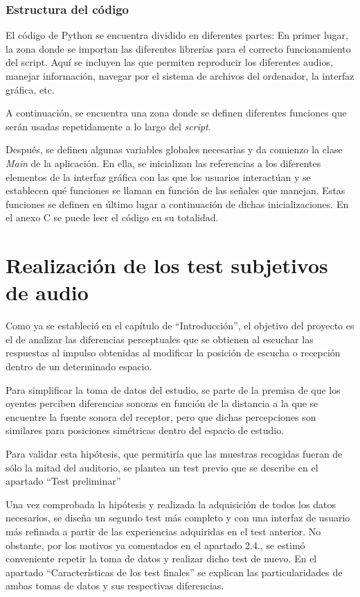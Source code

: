 \documentclass[11pt,a4paper]{book}
\begin{document}
            \subsection{Estructura del código}
                El código de Python se encuentra dividido en diferentes partes:
                En primer lugar, la zona donde se importan las diferentes librerías para el correcto funcionamiento del script. Aquí se incluyen las que permiten reproducir los diferentes audios, manejar información, navegar por el sistema de archivos del ordenador, la interfaz gráfica, etc.
                
                A continuación, se encuentra una zona donde se definen diferentes funciones que serán usadas repetidamente a lo largo del \textit{script}. 
                
                Después, se definen algunas variables globales necesarias y da comienzo la clase \textit{Main} de la aplicación. En ella, se inicializan las referencias a los diferentes elementos de la interfaz gráfica con las que los usuarios interactúan y se establecen qué funciones se llaman en función de las señales que manejan. Estas funciones se definen en último lugar a continuación de dichas inicializaciones. En el anexo C se puede leer el código en su totalidad.
                
\chapter{Realización de los test subjetivos de audio}
        Como ya se estableció en el capítulo de ``Introducción'', el objetivo del proyecto es el de analizar las diferencias perceptuales que se obtienen al escuchar las respuestas al impulso obtenidas al modificar la posición de escucha o recepción dentro de un determinado espacio.
        
        Para simplificar la toma de datos del estudio, se parte de la premisa de que los oyentes perciben diferencias sonoras en función de la distancia a la que se encuentre la fuente sonora del receptor, pero que dichas percepciones son similares para posiciones simétricas dentro del espacio de estudio.
        
        Para validar esta hipótesis, que permitiría que las muestras recogidas fueran de sólo la mitad del auditorio, se plantea un test previo que se describe en el apartado ``Test preliminar''
        
        Una vez comprobada la hipótesis y realizada la adquisición de todos los datos necesarios, se diseña un segundo test más completo y con una interfaz de usuario más refinada a partir de las experiencias adquiridas en el test anterior. No obstante, por los motivos ya comentados en el apartado 2.4., se estimó conveniente repetir la toma de datos y realizar dicho test de nuevo. En el apartado ``Características de los test finales'' se explican las particularidades de ambas tomas de datos y sus respectivas diferencias.
\end{document}
